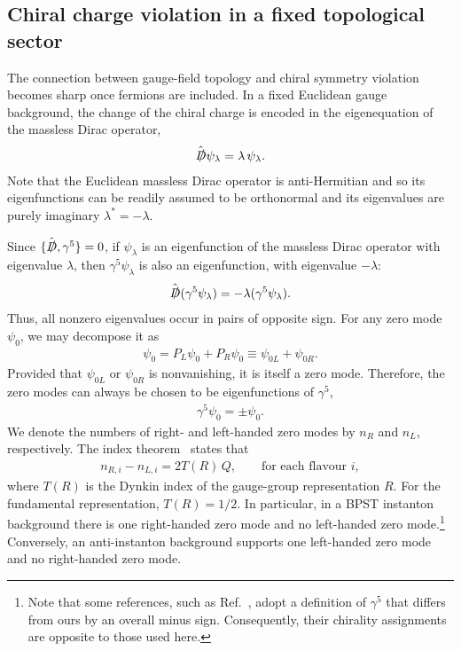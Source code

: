 \documentclass[review]{elsarticle}
\numberwithin{equation}{section}
\numberwithin{table}{section}
\numberwithin{figure}{section}
\begin{document}
\subsection{Chiral charge violation in a fixed topological sector}
\label{sec:chiral-charge-violation}

The connection between gauge-field topology and chiral symmetry violation becomes sharp once fermions are included. In a fixed Euclidean gauge background, the change of the chiral charge is encoded in the eigenequation of the massless Dirac operator,
\begin{align}
\label{eq:eigenequation-Dirac}
\hat{\slashed{D}}\psi_\lambda=\lambda\,\psi_\lambda.
\end{align}
Note that the Euclidean massless Dirac operator is anti-Hermitian and so its eigenfunctions can be readily assumed to be orthonormal and its eigenvalues are purely imaginary $\lambda^*=-\lambda$.

Since $\{\hat{\slashed{D}},\gamma^5\}=0$, if $\psi_\lambda$ is an eigenfunction of the massless Dirac operator with eigenvalue $\lambda$, then $\gamma^5\psi_\lambda$ is also an eigenfunction, with eigenvalue $-\lambda$:
\begin{align}
    \hat{\slashed{D}}(\gamma^5\psi_{\lambda}) = -\lambda(\gamma^5\psi_{\lambda}).
\end{align}
Thus, all nonzero eigenvalues occur in pairs of opposite sign. For any zero mode $\psi_0$, we may decompose it as
\begin{align}
    \psi_0=P_L\psi_0+P_R\psi_0 \equiv \psi_{0L}+\psi_{0R}.
\end{align}
Provided that $\psi_{0L}$ or $\psi_{0R}$ is nonvanishing, it is itself a zero mode. Therefore, the zero modes can always be chosen to be eigenfunctions of $\gamma^5$,
\begin{align}
    \gamma^5\psi_0 = \pm\psi_0.
\end{align}
We denote the numbers of right- and left-handed zero modes by $n_R$ and $n_L$, respectively. The index theorem~\cite{Atiyah:1963zz} states that
\begin{align}
    n_{R,i}-n_{L,i} = 2T(R)\,Q,
    \qquad 
    \text{for each flavour $i$},
    \label{eq:index-theorem}
\end{align}
where $T(R)$ is the Dynkin index of the gauge-group representation $R$. For the fundamental representation, $T(R)=1/2$. In particular, in a BPST instanton background there is one right-handed zero mode and no left-handed zero mode.\footnote{Note that some references, such as Ref.~\cite{Coleman:1985rnk}, adopt a definition of $\gamma^5$ that differs from ours by an overall minus sign. Consequently, their chirality assignments are opposite to those used here.
} Conversely, an anti-instanton background supports one left-handed zero mode and no right-handed zero mode.
\end{document}

